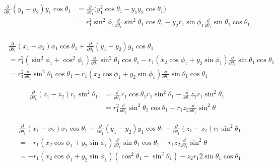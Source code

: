 \begin{align*}
    \frac{\partial}{\partial \theta_1} (y_1 - y_2)y_1\cos\theta_1
    &= \frac{\partial}{\partial \theta_1} \Big(y_1^2\cos\theta_1 - y_1y_2\cos\theta_1\Big) \\
    &= r_1^2\sin^2\phi_1\frac{\dd}{\dd \theta_1} \sin^2\theta_1\cos\theta_1 - y_2r_1\sin\phi_1\frac{\dd}{\dd \theta_1} \sin\theta_1\cos\theta_1 \\
\end{align*}

\begin{align*}
    &\frac{\partial}{\partial \theta_1} (x_1 - x_2)x_1\cos\theta_1 +  \frac{\partial}{\partial \theta_1} (y_1 - y_2)y_1\cos\theta_1 \\
    &= r_1^2(\sin^2\phi_1+\cos^2\phi_1) \frac{\dd}{\dd \theta_1}\sin^2\theta_1\cos\theta_1 - r_1(x_2\cos\phi_1 + y_2\sin\phi_1) \frac{\dd}{\dd \theta_1}\sin\theta_1\cos\theta_1 \\
    &= r_1^2 \frac{\dd}{\dd \theta_1}\sin^2\theta_1\cos\theta_1 - r_1(x_2\cos\phi_1 + y_2\sin\phi_1) \frac{\dd}{\dd \theta_1}\sin\theta_1\cos\theta_1
\end{align*}

\begin{align*}
    \frac{\partial}{\partial \theta_1} (z_1 - z_2)r_1\sin^2\theta_1
    &= \frac{\dd}{\dd \theta_1} r_1\cos\theta_1 r_1\sin^2\theta_1 - \frac{\dd}{\dd \theta_1}z_2r_1\sin^2\theta_1 \\
    &= r_1^2 \frac{\dd}{\dd \theta_1}\sin^2\theta_1\cos\theta_1 - r_1z_2 \frac{\dd}{\dd \theta_1}\sin^2\theta
\end{align*}

\begin{align*}
    &\frac{\partial}{\partial \theta_1} (x_1 - x_2)x_1\cos\theta_1 +  \frac{\partial}{\partial \theta_1} (y_1 - y_2)y_1\cos\theta_1 - \frac{\partial}{\partial \theta_1} (z_1 - z_2)r_1\sin^2\theta_1\\
    &= -r_1(x_2\cos\phi_1 + y_2\sin\phi_1) \frac{\dd}{\dd \theta_1}\sin\theta_1\cos\theta_1 - r_1z_2 \frac{\dd}{\dd \theta_1}\sin^2\theta \\
    &= -r_1(x_2\cos\phi_1 + y_2\sin\phi_1)(\cos^2\theta_1 - \sin^2\theta_1) - z_2r_1 2\sin\theta_1\cos\theta_1
\end{align*}

